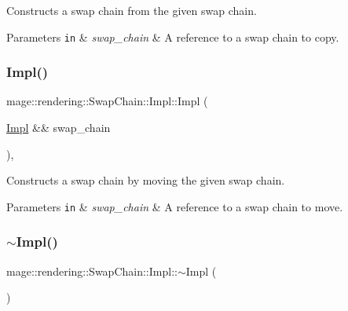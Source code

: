 Constructs a swap chain from the given swap chain.


\begin{DoxyParams}[1]{Parameters}
\mbox{\tt in}  & {\em swap\+\_\+chain} & A reference to a swap chain to copy. \\
\hline
\end{DoxyParams}
\hypertarget{classmage_1_1rendering_1_1_swap_chain_1_1_impl_aed29d0cdb54323cd670e5a690faed394}{}\label{classmage_1_1rendering_1_1_swap_chain_1_1_impl_aed29d0cdb54323cd670e5a690faed394} 
\subsubsection{\texorpdfstring{Impl()}{Impl()}\hspace{0.1cm}{\footnotesize\ttfamily [3/3]}}
{\footnotesize\ttfamily mage\+::rendering\+::\+Swap\+Chain\+::\+Impl\+::\+Impl (\begin{DoxyParamCaption}\item[{\hyperlink{classmage_1_1rendering_1_1_swap_chain_1_1_impl}{Impl} \&\&}]{swap\+\_\+chain }\end{DoxyParamCaption})\hspace{0.3cm}{\ttfamily [default]}, {\ttfamily [noexcept]}}

Constructs a swap chain by moving the given swap chain.


\begin{DoxyParams}[1]{Parameters}
\mbox{\tt in}  & {\em swap\+\_\+chain} & A reference to a swap chain to move. \\
\hline
\end{DoxyParams}
\hypertarget{classmage_1_1rendering_1_1_swap_chain_1_1_impl_ac41af1d1c99d284152447381045c169b}{}\label{classmage_1_1rendering_1_1_swap_chain_1_1_impl_ac41af1d1c99d284152447381045c169b} 
\subsubsection{\texorpdfstring{$\sim$\+Impl()}{~Impl()}}
{\footnotesize\ttfamily mage\+::rendering\+::\+Swap\+Chain\+::\+Impl\+::$\sim$\+Impl (\begin{DoxyParamCaption}{ }\end{DoxyParamCaption})}

